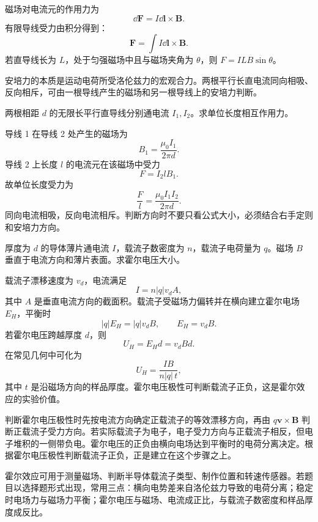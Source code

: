 \begin{definition}[安培力]\label{def:ampere-force}
磁场对电流元的作用力为
\[
  \dd\bm F=I\dd\bm l\times\bm B.
\]
有限导线受力由积分得到：
\[
  \bm F=\int I\dd\bm l\times\bm B.
\]
若直导线长为 $L$，处于匀强磁场中且与磁场夹角为 $\theta$，则 $F=ILB\sin\theta$。
\end{definition}

安培力的本质是运动电荷所受洛伦兹力的宏观合力。两根平行长直电流同向相吸、反向相斥，可由一根导线产生的磁场和另一根导线上的安培力判断。

\begin{example}[title={平行长直电流间的作用力}]\label{eg:parallel-current-force}
两根相距 $d$ 的无限长平行直导线分别通电流 $I_1,I_2$。求单位长度相互作用力。
\begin{solution}
导线 1 在导线 2 处产生的磁场为
\[
  B_1=\frac{\mu_0 I_1}{2\pi d}.
\]
导线 2 上长度 $l$ 的电流元在该磁场中受力
\[
  F=I_2 l B_1.
\]
故单位长度受力为
\[
  \frac{F}{l}=\frac{\mu_0 I_1I_2}{2\pi d}.
\]
同向电流相吸，反向电流相斥。判断方向时不要只看公式大小，必须结合右手定则和安培力方向。
\end{solution}
\end{example}

\begin{example}[title={霍尔效应的基本公式}]\label{eg:hall-effect}
厚度为 $d$ 的导体薄片通电流 $I$，载流子数密度为 $n$，载流子电荷量为 $q$。磁场 $B$ 垂直于电流方向和薄片表面。求霍尔电压大小。
\begin{solution}
载流子漂移速度为 $v_d$，电流满足
\[
  I=n|q|v_d A,
\]
其中 $A$ 是垂直电流方向的截面积。载流子受磁场力偏转并在横向建立霍尔电场 $E_H$，平衡时
\[
  |q|E_H=|q|v_dB,\qquad E_H=v_dB.
\]
若霍尔电压跨越厚度 $d$，则
\[
  U_H=E_Hd=v_dBd.
\]
在常见几何中可化为
\[
  U_H=\frac{IB}{n|q|\,t},
\]
其中 $t$ 是沿磁场方向的样品厚度。霍尔电压极性可判断载流子正负，这是霍尔效应的实验价值。
\end{solution}
\end{example}

\begin{method}[霍尔效应的极性判断]
判断霍尔电压极性时先按电流方向确定正载流子的等效漂移方向，再由 $q\bm v\times\bm B$ 判断正载流子受力方向。若实际载流子为电子，电子受力方向与正载流子相反，但电子堆积的一侧带负电。霍尔电压的正负由横向电场达到平衡时的电荷分离决定。根据霍尔电压极性判断载流子正负，正是建立在这个步骤之上。
\end{method}

\begin{attention}[霍尔效应的应用性结论]
霍尔效应可用于测量磁场、判断半导体载流子类型、制作位置和转速传感器。若题目以选择题形式出现，常用三点：横向电势差来自洛伦兹力导致的电荷分离；稳定时电场力与磁场力平衡；霍尔电压与磁场、电流成正比，与载流子数密度和样品厚度成反比。
\end{attention}

